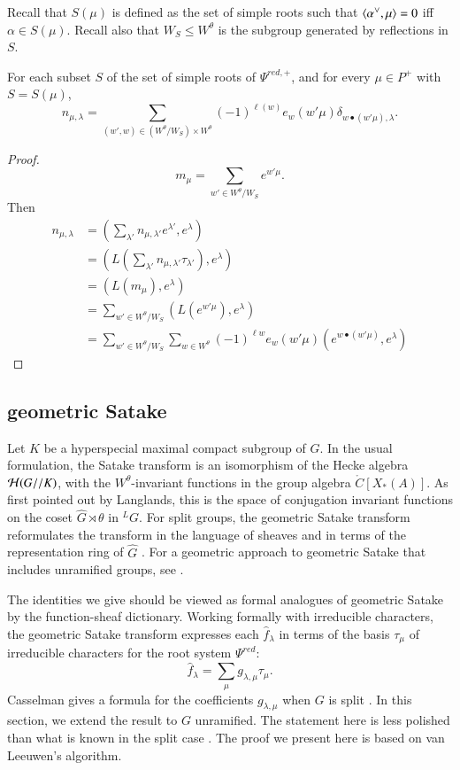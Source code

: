 Recall that $S(\mu)$ is defined as the set of simple roots such that
$\langle{\alpha^\vee,\mu}\rangle=0$ iff $\alpha\in S(\mu)$.  Recall also that
$W_S\le W^\theta$ is the subgroup generated by reflections in $S$.

\begin{lemma}  \label{lemma:van}
  For each subset $S$ of the set of simple roots of $\Psi^{red,+}$, and
  for every $\mu\in P^+$ with $S = S(\mu)$,
\[
n_{\mu,\lambda}=\sum_{(w',w)\in (W^\theta/W_S)\times W^\theta}
 (-1)^{\ell(w)} e_w(w'\mu) \delta_{w\bullet (w'\mu),\lambda}. 
\]
\end{lemma}

\begin{proof}  
\[
m_\mu = \sum_{w'\in W^\theta/W_S} e^{w' \mu}.
\]
Then
\begin{align*}
n_{\mu,\lambda} 
    &= (\sum_{\lambda'} n_{\mu,{\lambda'}} e^{\lambda'},e^\lambda) \\
     &= (L(\sum_{\lambda'} n_{\mu,\lambda'} \tau_{\lambda'}),e^\lambda) \\
     &= (L(m_\mu),e^\lambda) \\
     &= \sum_{w'\in W^\theta/W_S} (L(e^{w'\mu}),e^\lambda)\\
     &= \sum_{w'\in W^\theta/W_S} \sum_{w\in W^\theta} 
      (-1)^{\ell w} e_w(w'\mu) (e^{w\bullet (w'\mu)},e^\lambda)
\end{align*}
\end{proof}


\subsection{geometric Satake}

Let $K$ be a hyperspecial maximal compact subgroup of $G$.  In the
usual formulation, the Satake transform is an isomorphism of the Hecke
algebra $\mathcal H(G//K)$, with the $W^\theta$-invariant functions
in the group algebra $\ring{C}[X_*(A)]$.  As first pointed out by
Langlands, this is the space of conjugation invariant functions on the
coset $\hat G\rtimes \theta$ in ${}^LG$.  For split groups, the
geometric Satake transform reformulates the transform in the language
of sheaves and in terms of the representation ring of $\hat G$
\cite{mirkovic2007geometric}.  For a geometric approach to geometric
Satake that includes unramified groups, see \cite{zhu2011geometric}.

The identities we give should be viewed as formal analogues of
geometric Satake by the function-sheaf
dictionary. %
Working formally with irreducible characters, the geometric Satake
transform expresses each $\hat f_\lambda$ in terms of the basis
$\tau_\mu$ of irreducible characters for the root system $\Psi^{red}$:
\begin{equation}\label{eqn:geometric-satake}
\hat f_\lambda = \sum_\mu g_{\lambda,\mu} \tau_\mu.
\end{equation}
Casselman gives a formula for the coefficients $g_{\lambda,\mu}$ when
$G$ is split \cite{casymmetric}.  In this section, we extend the
result to $G$ unramified.  The statement here is less polished than
what is known in the split case \cite{casymmetric}.  The proof we
present here is based on van Leeuwen's algorithm.

